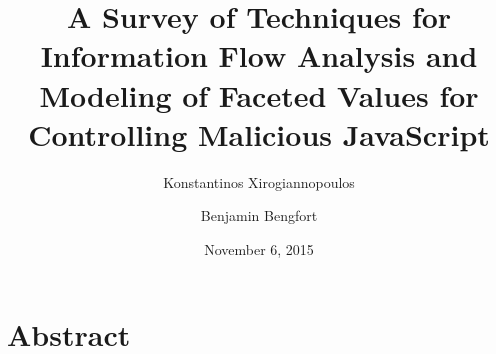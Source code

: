 \documentclass[11pt,letterpaper]{article}
\begin{document}
\title{A Survey of Techniques for Information Flow Analysis and Modeling of Faceted Values for Controlling Malicious JavaScript}
\author[ ]{Konstantinos Xirogiannopoulos}
\author[ ]{Benjamin Bengfort}

\date{November 6, 2015}

\maketitle

\section*{Abstract}
\end{document}

